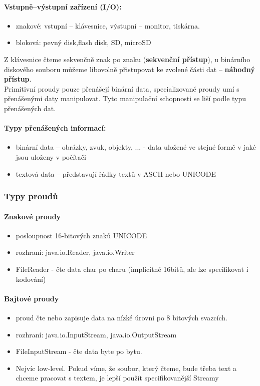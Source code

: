 \documentclass[10pt,a4paper]{article}
\begin{document}
\paragraph{Vstupně–výstupní zařízení (I/O):}
\begin{itemize}
\item znakové: vstupní – klávesnice, výstupní – monitor, tiskárna.
\item bloková: pevný disk,flash disk, SD, microSD
\end{itemize}
Z klávesnice čteme sekvenčně znak po znaku (\textbf{sekvenční přístup}), u binárního diskového souboru můžeme libovolně přistupovat ke zvolené části dat – \textbf{náhodný přístup}.\\
Primitivní proudy pouze přenášejí binární data, specializované proudy umí s přenášenými daty manipulovat. Tyto manipulační schopnosti se liší podle typu přenášených dat.
\paragraph{Typy přenášených informací:}
\begin{itemize}
\item binární data – obrázky, zvuk, objekty, ... - data uložené ve stejné formě v jaké jsou uloženy v počítači
\item textová data – představují řádky textů v ASCII nebo UNICODE
\end{itemize}
\subsubsection{Typy proudů}
\paragraph{Znakové proudy}
\begin{itemize}
\item posloupnost 16-bitových znaků UNICODE
\item rozhraní: java.io.Reader, java.io.Writer
\item FileReader - čte data char po charu (implicitně 16bitů, ale lze specifikovat i kodování)
\end{itemize}

\paragraph{Bajtové proudy}
\begin{itemize}
\item proud čte nebo zapisuje data na nízké úrovni po 8 bitových svazcích.
\item rozhraní:  java.io.InputStream, java.io.OutputStream
\item FileInputStream - čte data byte po bytu.
\item Nejvíc low-level. Pokud víme, že soubor, který čteme, bude třeba text a chceme pracovat s textem, je lepší použít specifikovanější Streamy
\end{itemize}
\end{document}
